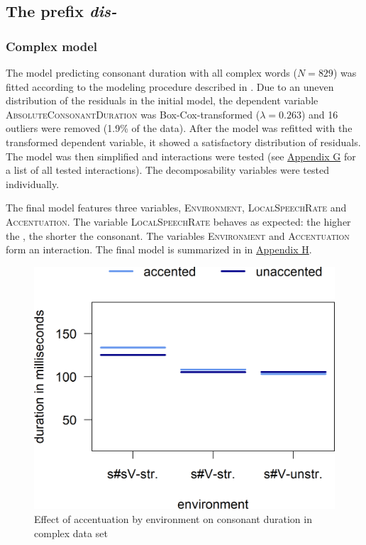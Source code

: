 \subsection{The prefix \textit{dis-} }


\subsubsection{Complex model}

The model predicting consonant duration with all complex words ($N=829$) was fitted according to the modeling procedure described in . Due to an uneven distribution of the residuals in the initial model, the dependent variable \textsc{AbsoluteConsonantDuration} was Box-Cox-transformed ($\lambda = 0.263$) and 16 outliers were removed (1.9\% of the data). After the model was refitted with the transformed dependent variable, it showed a satisfactory distribution of residuals. The model was then simplified and interactions were tested (see \hyperref[Appendix G Summaries of tested interactions in experimental study]{Appendix G} for a list of all tested interactions). The decomposability variables were tested individually.

The final model features three variables, \textsc{Environment}, \textsc{LocalSpeechRate} and \textsc{Accentuation}. The variable \textsc{LocalSpeechRate} behaves as expected: the higher the , the shorter the consonant. The variables \textsc{Environment} and \textsc{Accentuation} form an interaction. The final model is summarized in  in \hyperref[Appendix H: Model Summaries Experiment]{Appendix H}.






\begin{figure}
	
	\includegraphics [scale=0.5] {images/Experiment/DisModelInterEnvAcc}
	\caption{Effect of accentuation by environment on consonant duration in complex data set}
	\label{fig:NumNasal disComplex experiment}
\end{figure}



